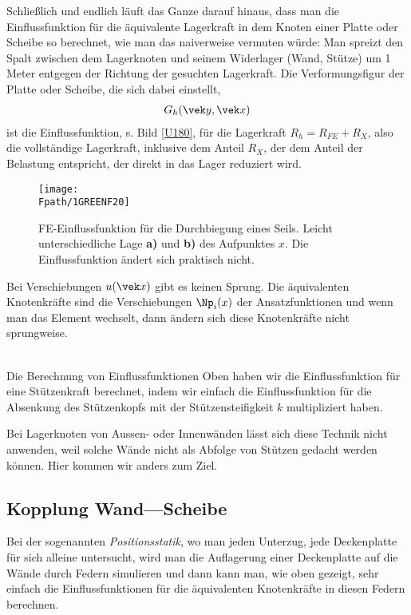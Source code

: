 {{{Schlie{\ss}lich und endlich l\"{a}uft das Ganze darauf hinaus, dass man die Einflussfunktion f\"{u}r die \"{a}quivalente Lagerkraft in dem Knoten einer Platte oder Scheibe so berechnet, wie man das naiverweise vermuten w\"{u}rde: Man spreizt den Spalt zwischen dem Lagerknoten und seinem Widerlager (Wand, St\"{u}tze) um 1 Meter entgegen der Richtung der gesuchten Lagerkraft. Die Verformungsfigur der Platte oder Scheibe, die sich dabei einstellt,
\begin{align}
G_h(\vek y,\vek x)
\end{align}
ist die Einflussfunktion, s. Bild \ref{U180}, f\"{u}r die Lagerkraft $R_h = R_{FE} + R_X$, also die vollst\"{a}ndige Lagerkraft, inklusive dem Anteil $R_X$, der dem Anteil der Belastung entspricht, der direkt in das Lager reduziert wird.\\

\begin{figure}
\centering
\if {} \sidecaption \fi
\texttt{[image: \\Fpath/1GREENF20]}
\caption{FE-Einflussfunktion f\"{u}r die Durchbiegung eines Seils. Leicht unterschiedliche Lage \textbf{ a)} und \textbf{ b)} des Aufpunktes $x$. Die Einflussfunktion \"{a}ndert sich praktisch nicht.}
\label{1GreenF20}%
%
\end{figure}%

Bei Verschiebungen $u(\vek x)$ gibt es keinen Sprung. Die \"{a}quivalenten Knotenkr\"{a}fte sind die Verschiebungen $\Np_i(x)$ der Ansatzfunktionen und wenn man das Element wechselt, dann \"{a}ndern sich diese Knotenkr\"{a}fte nicht sprungweise.

\\

Die Berechnung von Einflussfunktionen
Oben haben wir die Einflussfunktion f\"{u}r eine St\"{u}tzenkraft berechnet, indem wir einfach die Einflussfunktion f\"{u}r die Absenkung des St\"{u}tzenkopfs mit der St\"{u}tzensteifigkeit $k$ multipliziert haben.

Bei Lagerknoten von Aussen- oder Innenw\"{a}nden l\"{a}sst sich diese Technik nicht anwenden, weil solche W\"{a}nde nicht als Abfolge von St\"{u}tzen gedacht werden k\"{o}nnen. Hier kommen wir anders zum Ziel.

{\textcolor{blau2}{\section{Kopplung Wand---Scheibe}}
Bei der sogenannten {\em Positionsstatik\/}, wo man jeden Unterzug, jede Deckenplatte f\"{u}r sich alleine untersucht, wird man die Auflagerung einer Deckenplatte auf die W\"{a}nde durch Federn simulieren und dann kann man, wie oben gezeigt, sehr einfach die Einflussfunktionen f\"{u}r die \"{a}quivalenten Knotenkr\"{a}fte in diesen Federn berechnen.

}}}}
